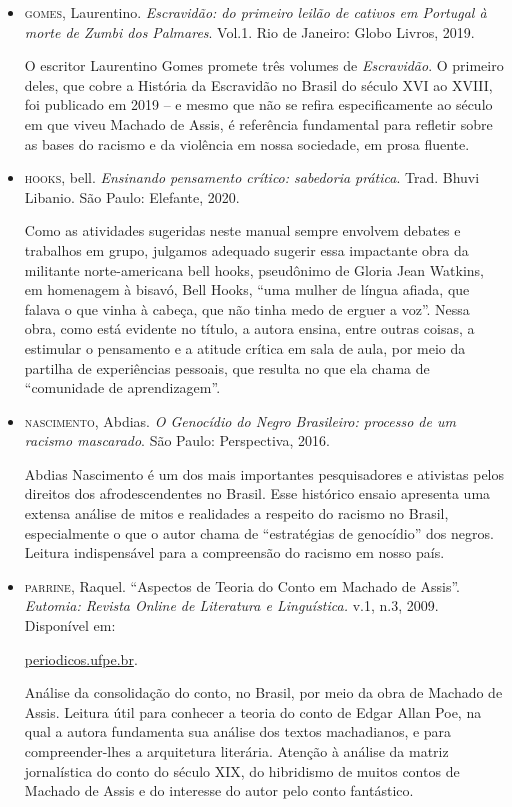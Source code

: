 \documentclass[11pt]{extarticle}
\begin{document}
\begin{itemize}
\item \textsc{gomes}, Laurentino. \textit{Escravidão: do primeiro leilão de cativos em
Portugal à morte de Zumbi dos Palmares}. Vol.1. Rio de Janeiro: Globo
Livros, 2019.

O escritor Laurentino Gomes promete três volumes de \emph{Escravidão}. O
primeiro deles, que cobre a História da Escravidão no Brasil do século
XVI ao XVIII, foi publicado em 2019 -- e mesmo que não se refira
especificamente ao século em que viveu Machado de Assis, é referência
fundamental para refletir sobre as bases do racismo e da violência em
nossa sociedade, em prosa fluente.

\item \textsc{hooks}, bell. \textit{Ensinando pensamento crítico: sabedoria prática}.
Trad. Bhuvi Libanio. São Paulo: Elefante, 2020.

Como as atividades sugeridas neste manual sempre envolvem debates e
trabalhos em grupo, julgamos adequado sugerir essa impactante obra da
militante norte-americana bell hooks, pseudônimo de Gloria Jean Watkins,
em homenagem à bisavó, Bell Hooks, ``uma mulher de língua afiada, que
falava o que vinha à cabeça, que não tinha medo de erguer a voz''. Nessa
obra, como está evidente no título, a autora ensina, entre outras
coisas, a estimular o pensamento e a atitude crítica em sala de aula,
por meio da partilha de experiências pessoais, que resulta no que ela
chama de ``comunidade de aprendizagem''.

\item \textsc{nascimento}, Abdias. \textit{O Genocídio do Negro Brasileiro: processo de
um racismo mascarado}. São Paulo: Perspectiva, 2016.

Abdias Nascimento é um dos mais importantes pesquisadores e ativistas
pelos direitos dos afrodescendentes no Brasil. Esse histórico ensaio
apresenta uma extensa análise de mitos e realidades a respeito do
racismo no Brasil, especialmente o que o autor chama de ``estratégias de
genocídio'' dos negros. Leitura indispensável para a compreensão do
racismo em nosso país.

\item \textsc{parrine}, Raquel. ``Aspectos de Teoria do Conto em Machado de Assis''.
\textit{Eutomia: Revista Online de Literatura e Linguística.} v.1, n.3,
2009. Disponível em:

\href{https://periodicos.ufpe.br/revistas/EUTOMIA/article/view/1902/1489}{periodicos.ufpe.br}.

Análise da consolidação do conto, no Brasil, por meio da obra de Machado
de Assis. Leitura útil para conhecer a teoria do conto de Edgar Allan
Poe, na qual a autora fundamenta sua análise dos textos machadianos, e
para compreender-lhes a arquitetura literária. Atenção à análise da
matriz jornalística do conto do século XIX, do hibridismo de muitos
contos de Machado de Assis e do interesse do autor pelo conto
fantástico.


\end{itemize}
\end{document}
